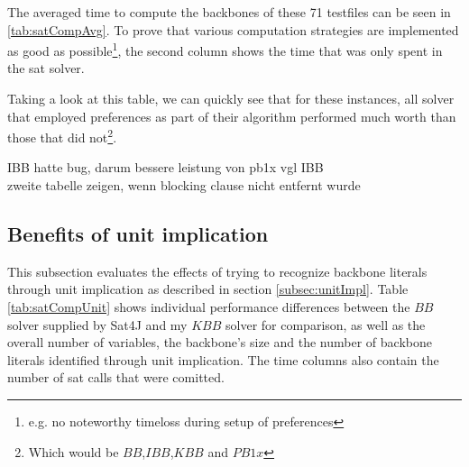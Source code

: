 The averaged time to compute the backbones of these 71 testfiles can be seen in \ref{tab:satCompAvg}. To prove that various computation strategies are implemented as good as possible\footnote{e.g. no noteworthy timeloss during setup of preferences}, the second column shows the time that was only spent in the sat solver.

Taking a look at this table, we can quickly see that for these instances, all solver that employed preferences as part of their algorithm performed much worth than those that did not\footnote{Which would be $BB$,$IBB$,$KBB$ and $PB1x$}.

IBB hatte bug, darum bessere leistung von pb1x vgl IBB\\
zweite tabelle zeigen, wenn blocking clause nicht entfernt wurde


\subsection{Benefits of unit implication}

This subsection evaluates the effects of trying to recognize backbone literals through unit implication as described in section \ref{subsec:unitImpl}. Table \ref{tab:satCompUnit} shows individual performance differences between the $BB$ solver supplied by Sat4J and my $KBB$ solver for comparison, as well as the overall number of variables, the backbone's size and the number of backbone literals identified through unit implication. The time columns also contain the number of sat calls that were comitted.

